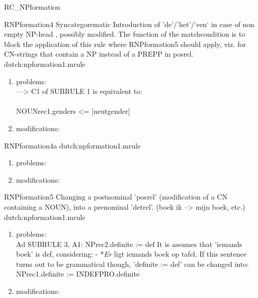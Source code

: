 \begin{mruleclass}{RC_NPformation}
\begin{members}
\begin{member}
\begin{enumerate}
\end{enumerate}

\end{member}
\begin{member}
 RNPformation4
Syncategorematic Introduction of 'de'/'het'/`een` in case of non empty NP-head ,
possibly  modified. The function of the matchcondition is to block the
application of this rule where RNPformation5 should apply, viz. for CN-strings
that contain a NP instead of a PREPP in posrel.
\file dutch:npformation1.mrule
\semantics \nosemantics
\example
\remarks\mbox{}
\begin{enumerate}
\item problems:\\
--->  C1 of SUBRULE 1 is equivalent to: \\ \\
                   NOUNrec1.genders <= [neutgender]
\item modifications:\\

\end{enumerate}

\end{member}
\begin{member}
 RNPformation4a
\file dutch:npformation1.mrule
\semantics \nosemantics
\example
\remarks\mbox{}
\begin{enumerate}
\item problems:\\

\item modifications:\\

\end{enumerate}

\end{member}
\begin{member}
 RNPformation5
 Changing a postnominal 'posrel' (modification of a CN 
containing a NOUN), into a prenominal 'detrel'. 
(boek ik --> mijn boek, etc.)
\file dutch:npformation1.mrule
\semantics \nosemantics
\example 
\begin{enumerate}
\remarks\mbox{}
\begin{enumerate}
\item problems:\\
Ad SUBRULE 3, A1:  NPrec2.definite := def
It is assumes that 'iemands boek' is def, considering:
               - *{\em Er} ligt iemands boek op tafel.
If this sentence turns out to be grammatical though, 'definite := def'  can
be changed into:   NPrec1.definite := INDEFPRO.definite
\item modifications:\\


\end{enumerate}
\end{enumerate}
\end{member}
\end{members}
\end{mruleclass}
